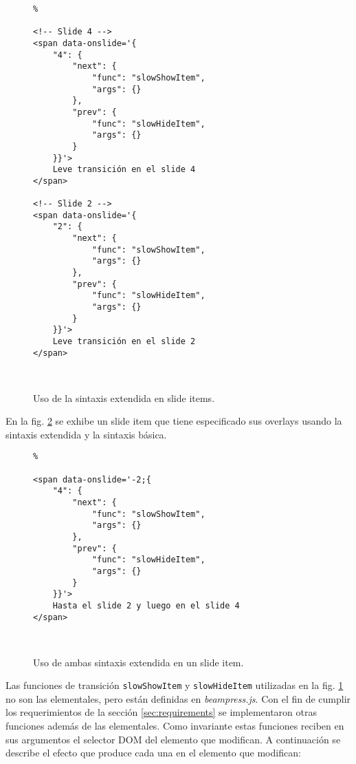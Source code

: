 			\begin{figure}[htb]%
				\begin{lstlisting}%

<!-- Slide 4 -->
<span data-onslide='{
    "4": {
        "next": {
            "func": "slowShowItem",
            "args": {}
        },
        "prev": {
            "func": "slowHideItem",
            "args": {}
        }
    }}'>
	Leve transición en el slide 4
</span>

<!-- Slide 2 -->
<span data-onslide='{
    "2": {
        "next": {
            "func": "slowShowItem",
            "args": {}
        },
        "prev": {
            "func": "slowHideItem",
            "args": {}
        }
    }}'>
	Leve transición en el slide 2
</span>

			
				\end{lstlisting}
				\caption{Uso de la sintaxis extendida en slide items.} 
				\label{fig:extended_syntax_html}
			\end{figure}

			En la fig. \ref{fig:basic_and_extended_syntax_html} se exhibe un slide item que tiene especificado sus overlays usando la sintaxis extendida y la sintaxis básica.


			\begin{figure}[htb]%
				\begin{lstlisting}%

<span data-onslide='-2;{
    "4": {
        "next": {
            "func": "slowShowItem",
            "args": {}
        },
        "prev": {
            "func": "slowHideItem",
            "args": {}
        }
    }}'>
	Hasta el slide 2 y luego en el slide 4
</span>

			
				\end{lstlisting}
				\caption{Uso de ambas sintaxis extendida en un slide item.} 
				\label{fig:basic_and_extended_syntax_html}
			\end{figure}			


			Las funciones de transición \texttt{slowShowItem} y \texttt{slowHideItem} utilizadas en la fig. \ref{fig:extended_syntax_html} no son las elementales, pero están definidas en \textit{beampress.js}. Con el fin de cumplir los requerimientos de la sección \ref{sec:requirements} se implementaron otras funciones además de las elementales. Como invariante estas funciones reciben en sus argumentos el selector DOM del elemento que modifican. A continuación se describe el efecto que produce cada una en el elemento que modifican:

